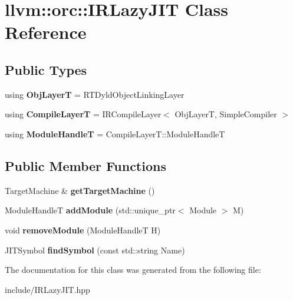 \hypertarget{classllvm_1_1orc_1_1_i_r_lazy_j_i_t}{}\section{llvm\+:\+:orc\+:\+:I\+R\+Lazy\+J\+IT Class Reference}
\label{classllvm_1_1orc_1_1_i_r_lazy_j_i_t}
\subsection*{Public Types}
\begin{DoxyCompactItemize}
\item 
using {\bfseries Obj\+LayerT} = R\+T\+Dyld\+Object\+Linking\+Layer\hypertarget{classllvm_1_1orc_1_1_i_r_lazy_j_i_t_aa38d34dc778643c79ebf32790c85e8bf}{}\label{classllvm_1_1orc_1_1_i_r_lazy_j_i_t_aa38d34dc778643c79ebf32790c85e8bf}

\item 
using {\bfseries Compile\+LayerT} = I\+R\+Compile\+Layer$<$ Obj\+LayerT, Simple\+Compiler $>$\hypertarget{classllvm_1_1orc_1_1_i_r_lazy_j_i_t_a6295103c3e813290d1359ec7d5771b27}{}\label{classllvm_1_1orc_1_1_i_r_lazy_j_i_t_a6295103c3e813290d1359ec7d5771b27}

\item 
using {\bfseries Module\+HandleT} = Compile\+Layer\+T\+::\+Module\+HandleT\hypertarget{classllvm_1_1orc_1_1_i_r_lazy_j_i_t_ab48ef40ded83ea0117c98b55cf93712e}{}\label{classllvm_1_1orc_1_1_i_r_lazy_j_i_t_ab48ef40ded83ea0117c98b55cf93712e}

\end{DoxyCompactItemize}
\subsection*{Public Member Functions}
\begin{DoxyCompactItemize}
\item 
Target\+Machine \& {\bfseries get\+Target\+Machine} ()\hypertarget{classllvm_1_1orc_1_1_i_r_lazy_j_i_t_a01f3adde0081fb2ab00ef823e8c1712f}{}\label{classllvm_1_1orc_1_1_i_r_lazy_j_i_t_a01f3adde0081fb2ab00ef823e8c1712f}

\item 
Module\+HandleT {\bfseries add\+Module} (std\+::unique\+\_\+ptr$<$ Module $>$ M)\hypertarget{classllvm_1_1orc_1_1_i_r_lazy_j_i_t_a98746df5165ebcf5d2358e275cbbb4ef}{}\label{classllvm_1_1orc_1_1_i_r_lazy_j_i_t_a98746df5165ebcf5d2358e275cbbb4ef}

\item 
void {\bfseries remove\+Module} (Module\+HandleT H)\hypertarget{classllvm_1_1orc_1_1_i_r_lazy_j_i_t_affd00d53768bd9b50e1e68521d4d1aca}{}\label{classllvm_1_1orc_1_1_i_r_lazy_j_i_t_affd00d53768bd9b50e1e68521d4d1aca}

\item 
J\+I\+T\+Symbol {\bfseries find\+Symbol} (const std\+::string Name)\hypertarget{classllvm_1_1orc_1_1_i_r_lazy_j_i_t_a251720f0ec33b902836990c74143cd02}{}\label{classllvm_1_1orc_1_1_i_r_lazy_j_i_t_a251720f0ec33b902836990c74143cd02}

\end{DoxyCompactItemize}


The documentation for this class was generated from the following file\+:\begin{DoxyCompactItemize}
\item 
include/I\+R\+Lazy\+J\+I\+T.\+hpp\end{DoxyCompactItemize}
